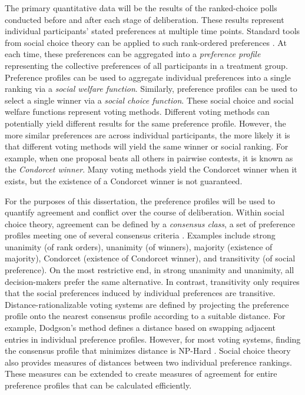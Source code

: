The primary quantitative data will be the results of the ranked-choice
polls conducted before and after each stage of deliberation.
These results represent individual participants' stated preferences at multiple
time points.
Standard tools from social choice theory can be applied to such rank-ordered
preferences \cite{arrow_social_2012, brandt_computational_2012}.
At each time, these preferences can be aggregated into a {\em preference profile}
representing the collective preferences of all participants in a treatment group.
Preference profiles can be used to aggregate individual preferences into a single
ranking via a {\em social welfare function}.
Similarly, preference profiles can be used to select a single winner via a
{\em social choice function}.
These social choice and social welfare functions represent voting methods.
Different voting methods can potentially yield different results for the same
preference profile.
However, the more similar preferences are across individual participants,
the more likely it is that different voting methods will yield the same winner
or social ranking.
For example, when one proposal beats all others in pairwise contests, it is known as the
{\em Condorcet winner}.
Many voting methods yield the Condorcet winner when it exists, but the existence
of a Condorcet winner is not guaranteed.

For the purposes of this dissertation, the preference profiles will be used
to quantify agreement and conflict over the course of deliberation.
Within social choice theory, agreement can be defined by a {\em consensus class},
a set of preference profiles meeting one of several consensus criteria
\cite{elkind_rationalizations_2016}.
Examples include strong unanimity (of rank orders),
unanimity (of winners),
majority (existence of majority),
Condorcet (existence of Condorcet winner),
and transitivity (of social preference).
On the most restrictive end, in strong unanimity and unanimity,
all decision-makers prefer the same alternative.
In contrast, transitivity only requires that the social preferences induced by
individual preferences are transitive.
Distance-rationalizable voting systems are defined by projecting the preference
profile onto the nearest consensus profile according to a suitable distance.
For example, Dodgson's method \cite{dodgeson_method_1876, brandt_computational_2012}
defines a distance based on swapping adjacent entries in individual preference profiles.
However, for most voting systems,
finding the consensus profile that minimizes distance is NP-Hard
\cite{elkind_rationalizations_2016}.
Social choice theory also provides measures of distances between two individual
preference rankings.
These measures can be extended to create measures of agreement for entire
preference profiles that can be calculated efficiently.

